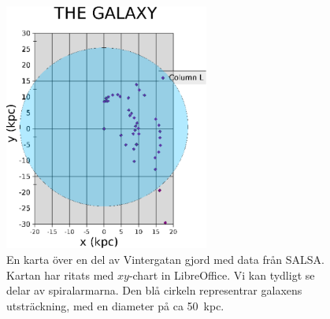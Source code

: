 \begin{figure}[t]
\begin{center}
\includegraphics[width=0.6\textwidth]{../figures/galaxopenoffice1.pdf}
\caption{En karta över en del av Vintergatan gjord med data från SALSA. Kartan har 
	ritats med $xy$-chart in LibreOffice.  Vi kan tydligt se delar av spiralarmarna.
	Den blå cirkeln representrar galaxens utsträckning, med en diameter på ca 50~kpc.}
\label{fig:mapfinal}
\end{center}
\end{figure}
